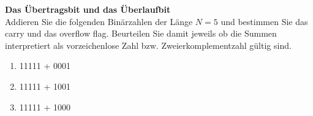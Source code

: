 \textbf{Das Übertragsbit und das Überlaufbit}\\
Addieren Sie die folgenden Binärzahlen der Länge $N=5$ und bestimmen Sie das carry und das overflow flag. Beurteilen Sie damit jeweils ob die Summen interpretiert als vorzeichenlose Zahl bzw. Zweierkomplementzahl gültig sind.
\begin{enumerate}
	\item 11111 + 0001
	\item 11111 + 1001
	\item 11111 + 1000
\end{enumerate}